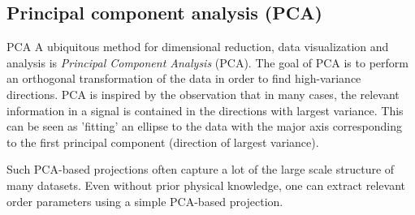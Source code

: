 \subsection{Principal component analysis (PCA)}
\label{subsec:dimRedPCA}
\begin{mybox}{PCA}
A ubiquitous method for dimensional reduction, data visualization and analysis is \emph{Principal Component Analysis} (PCA). The goal of PCA is to perform an orthogonal transformation of the data in order to find high-variance directions. PCA is inspired by the observation that in many cases, the relevant information in a signal is contained in the directions with largest variance. This can be seen as ’fitting’ an ellipse to the data with the major axis corresponding to the first principal component (direction of largest variance).
\end{mybox}
Such PCA-based projections often capture a lot of the large scale structure of many datasets. Even without prior physical knowledge, one can extract relevant order parameters using a simple PCA-based projection.
